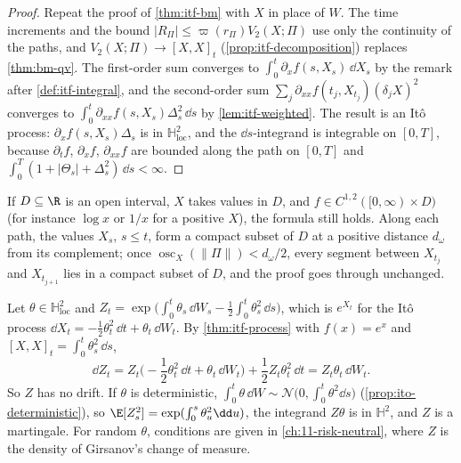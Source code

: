 \begin{proof}
Repeat the proof of \cref{thm:itf-bm} with $X$ in place of $W$. The time increments and the bound
$|R_\Pi|\le\varpi(r_\Pi)V_2(X;\Pi)$ use only the continuity of the paths, and
$V_2(X;\Pi)\to[X,X]_t$ (\cref{prop:itf-decomposition}) replaces \cref{thm:bm-qv}. The
first-order sum converges to $\int_0^t\partial_xf(s,X_s)\,\dd X_s$ by the remark after
\cref{def:itf-integral}, and the second-order sum
$\sum_j\partial_{xx}f(t_j,X_{t_j})(\delta_jX)^2$ converges to
$\int_0^t\partial_{xx}f(s,X_s)\Delta_s^2\,\dd s$ by \cref{lem:itf-weighted}. The result is an It\^o
process: $\partial_xf(s,X_s)\Delta_s$ is in $\mathbb H^2_{\mathrm{loc}}$, and the $\dd s$-integrand is
integrable on $[0,T]$, because $\partial_tf$, $\partial_xf$, $\partial_{xx}f$ are bounded along the
path on $[0,T]$ and $\int_0^T(1+|\Theta_s|+\Delta_s^2)\,\dd s<\infty$.
\end{proof}

\begin{remark}\label{rem:itf-open}
If $D\subseteq\R$ is an open interval, $X$ takes values in $D$, and $f\in C^{1,2}([0,\infty)\times D)$
(for instance $\log x$ or $1/x$ for a positive $X$), the formula still holds. Along each path, the values $X_s$, $s\le t$, form a compact subset of $D$ at a positive
distance $d_\omega$ from its complement; once $\operatorname{osc}_X(\|\Pi\|)<d_\omega/2$, every
segment between $X_{t_j}$ and $X_{t_{j+1}}$ lies in a compact subset of $D$, and the proof goes
through unchanged.
\end{remark}

\begin{example}\label{exa:itf-exponential}
Let $\theta\in\mathbb H^2_{\mathrm{loc}}$ and
$Z_t=\exp\big(\int_0^t\theta_s\,\dd W_s-\frac12\int_0^t\theta_s^2\,\dd s\big)$, which is $e^{X_t}$ for the
It\^o process $\dd X_t=-\frac12\theta_t^2\,\dd t+\theta_t\,\dd W_t$. By \cref{thm:itf-process} with
$f(x)=e^x$ and $[X,X]_t=\int_0^t\theta_s^2\,\dd s$,
\[
  \dd Z_t=Z_t\Big(-\frac12\theta_t^2\,\dd t+\theta_t\,\dd W_t\Big)+\frac12Z_t\theta_t^2\,\dd t=Z_t\theta_t\,\dd W_t .
\]
So $Z$ has no drift. If $\theta$ is deterministic, $\int_0^t\theta\,\dd W\sim\mathcal N\big(0,\int_0^t\theta^2\dd s\big)$
(\cref{prop:ito-deterministic}), so $\E[Z_s^2]=\exp(\int_0^s\theta_u^2\dd u)$, the integrand $Z\theta$ is in
$\mathbb H^2$, and $Z$ is a martingale. For random $\theta$, conditions are given in
\cref{ch:11-risk-neutral}, where $Z$ is the density of Girsanov's change of measure.
\end{example}

